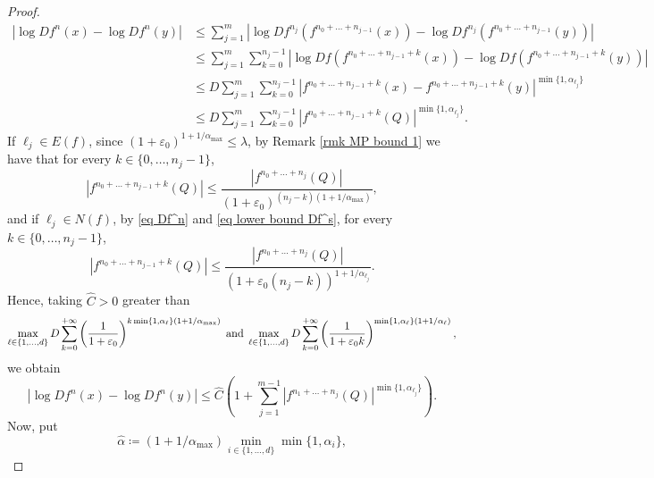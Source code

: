 \documentclass[12pt]{amsart}
\numberwithin{equation}{section} %
\numberwithin{figure}{section} %
\theoremstyle{plain}
\theoremstyle{definition}
\theoremstyle{remark}
\theoremstyle{citing}
\renewcommand{\=}{\coloneqq}
\begin{document}
\begin{proof}
    \begin{equation*}
    \begin{split}
        |\log Df^n(x) - \log Df^n(y)| &\leq \sum_{j=1}^{m} |\log Df^{n_j}(f^{n_0+\ldots+n_{j-1}}(x)) - \log Df^{n_j}(f^{n_0+\ldots+n_{j-1}}(y))|\\
        &\leq  \sum_{j=1}^m \sum_{k=0}^{n_j -1}|\log Df(f^{n_0+\ldots+n_{j-1} + k}(x)) - \log Df(f^{n_0+\ldots+n_{j-1} + k}(y))|\\
        &\leq D\sum_{j=1}^{m}\sum_{k=0}^{n_j-1} |f^{n_0+\ldots+n_{j-1} + k}(x) - f^{n_0+\ldots+n_{j-1} + k}(y)|^{\min\{1,\alpha_{\ell_j}\}}\\
        &\leq D\sum_{j=1}^{m}\sum_{k=0}^{n_j-1} |f^{n_0+\ldots+n_{j-1} + k}(Q)|^{\min\{1,\alpha_{\ell_j}\}}.
        \end{split}
    \end{equation*}
    If $\ell_j\in E(f)$, since $(1+\varepsilon_0)^{1+1/\alpha_{\max}}\leq \lambda$, by Remark \ref{rmk MP bound 1} we have that for every $k\in \{0,\ldots, n_j -1\}$,
    \begin{equation}
        |f^{n_0+\ldots+n_{j-1} + k}(Q)| \leq \frac{|f^{n_0+\ldots + n_j}(Q)|}{(1+\varepsilon_0 )^{(n_j - k)(1+1/\alpha_{\max})}},
    \end{equation}
    and if $\ell_j \in N(f)$, by \eqref{eq Df^n} and \eqref{eq lower bound Df^s}, for every $k\in\{0,\ldots,n_j-1\}$,
    \begin{equation}
        |f^{n_0+\ldots+n_{j-1} + k}(Q)| \leq \frac{|f^{n_0+\ldots + n_j}(Q)|}{(1+\varepsilon_0(n_j-k) )^{1+1/\alpha_{\ell_j}}}.
    \end{equation}
    Hence, taking $\widehat{C}>0$ greater than 
    \begin{equation*}
       \max_{\ell\in\{1,\ldots,d\}}D \sum_{k=0}^{+\infty} \left(\frac{1}{1+\varepsilon_0}\right)^{k\min\{1,\alpha_{\ell}\}(1+1/\alpha_{\max})} \text{\;and\;} \max_{\ell\in\{1,\ldots,d\}}D\sum_{k=0}^{+\infty} \left(\frac{1}{1+ \varepsilon_0 k}\right)^{\min\{1,\alpha_{\ell}\}(1+1/\alpha_{\ell})},
    \end{equation*}
    we obtain
    \begin{equation}\label{eq 2 MP bound}
        |\log Df^n(x) - \log Df^n(y)| \leq \widehat{C}\left( 1 + \sum_{j=1}^{m-1} |f^{n_1+\ldots + n_j}(Q)|^{\min\{1,\alpha_{\ell_j}\}}\right).
    \end{equation}
    Now, put 
    \begin{equation*}
        \widehat{\alpha}\=  (1+1/\alpha_{\max})\min_{i\in \{1,\dots,d\}}\min\{1,\alpha_i\},

\end{equation*}
\end{proof}
\end{document}
